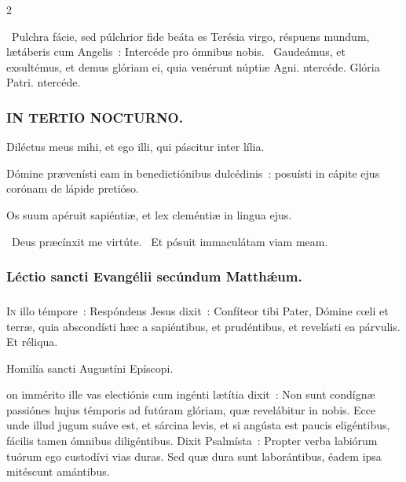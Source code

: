 \documentclass[9pt,twoside]{extarticle}
\begin{document}
\begin{multicols}{2}
{\begin{tightlist}{}
\item {}~Pulchra fácie, sed púlchrior fide beáta es Terésia virgo, réspuens mundum, lætáberis cum Angelis~: \textred{*} Intercéde pro ómnibus nobis. ~Gaudeámus, et exsultémus, et demus glóriam ei, quia venérunt núptiæ Agni. ntercéde. Glória Patri. ntercéde.
\end{tightlist}

\subsubsection*{\center \textsc{IN TERTIO NOCTURNO.}}
\begin{tightlist}{}
\item {} Diléctus meus mihi, et ego illi, qui páscitur inter lília.
\item {} Dómine prævenísti eam in benedictiónibus dulcédinis~: posuísti in cápite ejus corónam de lápide pretióso.
\item {} Os suum apéruit sapiéntiæ, et lex cleméntiæ in lingua ejus. 
\item {}~Deus præcínxit me virtúte. ~Et pósuit immaculátam viam meam.
\end{tightlist}

\subsubsection*{\center Léctio sancti Evangélii secúndum Matthǽum.}
\subsubsection*{\center {}}
\lettrine{I}n illo témpore~: Respóndens Jesus dixit~: Confíteor tibi Pater, Dómine cœli et terræ, quia abscondísti hæc a sapiéntibus, et prudéntibus, et revelásti ea párvulis. Et réliqua.

\begin{center}Homilía sancti Augustíni Epíscopi.\\
\end{center}
on immérito ille vas electiónis cum ingénti lætítia dixit~: Non sunt condígnæ passiónes hujus témporis ad futúram glóriam, quæ revelábitur in nobis. Ecce unde illud jugum suáve est, et sárcina levis, et si angústa est paucis eligéntibus, fácilis tamen ómnibus diligéntibus. Dixit Psalmísta~: Propter verba labiórum tuórum ego custodívi vias duras. Sed quæ dura sunt laborántibus, éadem ipsa mitéscunt amántibus.

}
\end{multicols}
\end{document}
